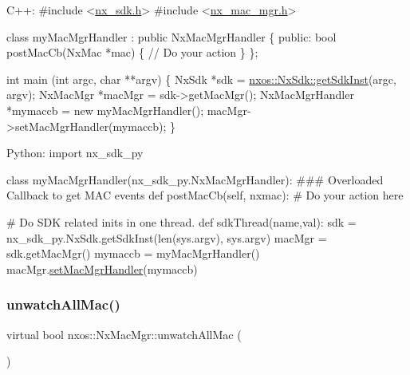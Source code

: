 \begin{DoxyCode}
C++:
\textcolor{preprocessor}{   #include <\mbox{\hyperlink{nx__sdk_8h}{nx\_sdk.h}}>}
\textcolor{preprocessor}{   #include <\mbox{\hyperlink{nx__mac__mgr_8h}{nx\_mac\_mgr.h}}>}

   \textcolor{keyword}{class }myMacMgrHandler : \textcolor{keyword}{public} NxMacMgrHandler \{
      \textcolor{keyword}{public}:
         \textcolor{keywordtype}{bool} postMacCb(NxMac *mac) \{
              \textcolor{comment}{// Do your action}
         \}
   \};

   \textcolor{keywordtype}{int}  main (\textcolor{keywordtype}{int} argc, \textcolor{keywordtype}{char} **argv)
   \{
        NxSdk    *sdk = \mbox{\hyperlink{classnxos_1_1_nx_sdk_a5050e2d26c40744b4fc7862068a83f39}{nxos::NxSdk::getSdkInst}}(argc, argv);
        NxMacMgr *macMgr = sdk->getMacMgr();
        NxMacMgrHandler *mymaccb = \textcolor{keyword}{new} myMacMgrHandler();
        macMgr->setMacMgrHandler(mymaccb);
   \}

Python:
   \textcolor{keyword}{import} nx\_sdk\_py

   \textcolor{keyword}{class }myMacMgrHandler(nx\_sdk\_py.NxMacMgrHandler):
\textcolor{preprocessor}{   ### Overloaded Callback to get MAC events}
         def postMacCb(self, nxmac):
\textcolor{preprocessor}{             # Do your action here}

\textcolor{preprocessor}{   # Do SDK related inits in one thread.}
   def sdkThread(name,val):
       sdk = nx\_sdk\_py.NxSdk.getSdkInst(len(sys.argv), sys.argv)
       macMgr = sdk.getMacMgr()
       mymaccb = myMacMgrHandler()
       macMgr.\mbox{\hyperlink{classnxos_1_1_nx_mac_mgr_a06f53bd41ddb17e6cfaef5a02b00415d}{setMacMgrHandler}}(mymaccb)
\end{DoxyCode}
 \mbox{\label{classnxos_1_1_nx_mac_mgr_aac2eae84327fa4a94616d214ac779fac}} 
\subsubsection{\texorpdfstring{unwatch\+All\+Mac()}{unwatchAllMac()}}
{\footnotesize\ttfamily virtual bool nxos\+::\+Nx\+Mac\+Mgr\+::unwatch\+All\+Mac (\begin{DoxyParamCaption}{ }\end{DoxyParamCaption})\hspace{0.3cm}{\ttfamily [pure virtual]}}

